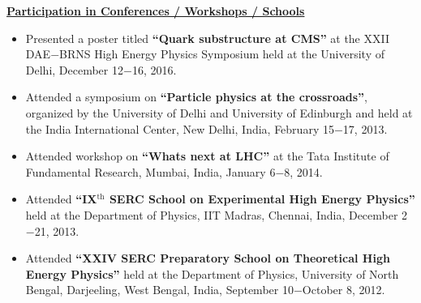 \documentclass[12pt,a4]{article}
\begin{document}
\pagebreak
\begin{center}
  \textbf{\large{\underline{Participation in Conferences / Workshops / Schools}}}
  \begin{itemize}
  \item Presented a poster titled \textbf{``Quark substructure at CMS''} at the XXII DAE$-$BRNS High Energy Physics Symposium held at the University of Delhi,
    December 12$-$16, 2016.
  \item Attended a symposium on \textbf{``Particle physics at the crossroads''}, organized by the University of Delhi and University of Edinburgh
    and held at the India International Center, New Delhi, India, February 15$-$17, 2013.
  \item Attended workshop on \textbf{``Whats next at LHC''} at the Tata Institute of Fundamental Research, Mumbai, India, January 6$-$8, 2014.
  \item Attended \textbf{``IX$^{\textrm{th}}$ SERC School on Experimental High Energy Physics''} held at the Department of Physics, IIT Madras, Chennai, India,
    December 2$-$21, 2013.
  \item Attended \textbf{``XXIV SERC Preparatory School on Theoretical High Energy Physics''} held at the Department of Physics, University of North Bengal,
    Darjeeling, West Bengal, India,  September 10$-$October 8, 2012.
  \end{itemize}
\end{center}
\end{document}
